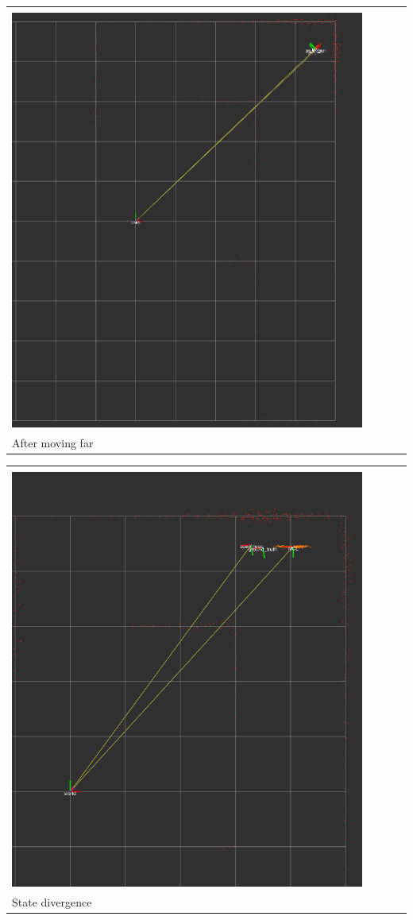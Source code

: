 \documentclass{article}
\begin{document}
\begin{enumerate}[label=(\roman*)]
\begin{tabular}[t]{l}
	\hline \\
	\includegraphics[width=0.9\textwidth]{img/p3-far.png} \\
	\hline
	After moving far \\
\end{tabular}

\begin{tabular}[t]{l}
	\hline \\
	\includegraphics[width=0.9\textwidth]{img/p3-diverge.png} \\
	\hline
	State divergence \\
\end{tabular}


\end{enumerate}
\end{document}
